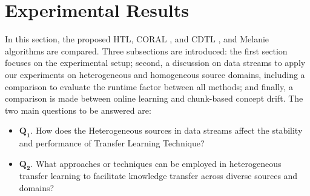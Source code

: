 
\section{Experimental Results}
\label{sec:4_5_Expsetup}

In this section, the proposed HTL, CORAL \cite{sun2016return}, and CDTL \cite{yang2021concept}, and Melanie \cite{dong2019multistream} algorithms are compared. Three subsections are introduced: the first section focuses on the experimental setup; second, a discussion on data streams to apply our experiments on heterogeneous and homogeneous source domains, including a comparison to evaluate the runtime factor between all methods; and finally, a comparison is made between online learning and chunk-based concept drift. The two main questions to be answered are:

\begin{itemize}
  
  \item $\pmb{Q_1}$. How does the Heterogeneous sources in data streams affect the stability and performance of Transfer Learning Technique?
  \item $\pmb{Q_2}$. What approaches or techniques can be employed in heterogeneous transfer learning to facilitate knowledge transfer across diverse sources and domains? 
  \end{itemize}



